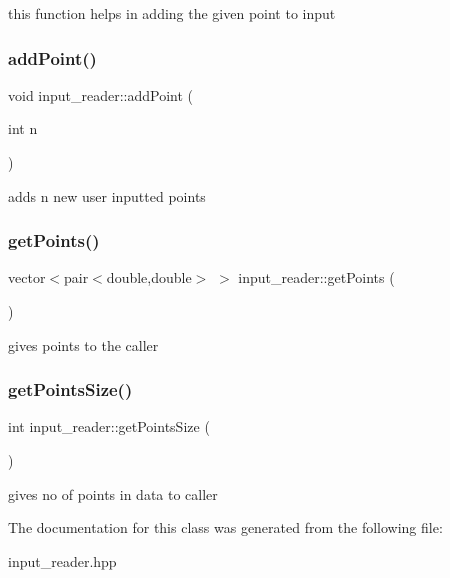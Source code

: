 this function helps in adding the given point to input \mbox{\label{classinput__reader_af90c2628a1731f7948f9026fec919ec7}} 
\subsubsection{\texorpdfstring{add\+Point()}{addPoint()}\hspace{0.1cm}{\footnotesize\ttfamily [2/2]}}
{\footnotesize\ttfamily void input\+\_\+reader\+::add\+Point (\begin{DoxyParamCaption}\item[{int}]{n }\end{DoxyParamCaption})\hspace{0.3cm}{\ttfamily [inline]}}

adds n new user inputted points \mbox{\label{classinput__reader_a8c77c4d25ef4bfe70a1044fcddc427c4}} 
\subsubsection{\texorpdfstring{get\+Points()}{getPoints()}}
{\footnotesize\ttfamily vector$<$pair$<$double,double$>$ $>$ input\+\_\+reader\+::get\+Points (\begin{DoxyParamCaption}{ }\end{DoxyParamCaption})\hspace{0.3cm}{\ttfamily [inline]}}

gives points to the caller \mbox{\label{classinput__reader_a43515656ecf3e997ca8e18fdc20385d8}} 
\subsubsection{\texorpdfstring{get\+Points\+Size()}{getPointsSize()}}
{\footnotesize\ttfamily int input\+\_\+reader\+::get\+Points\+Size (\begin{DoxyParamCaption}{ }\end{DoxyParamCaption})\hspace{0.3cm}{\ttfamily [inline]}}

gives no of points in data to caller 

The documentation for this class was generated from the following file\+:\begin{DoxyCompactItemize}
\item 
input\+\_\+reader.\+hpp\end{DoxyCompactItemize}
